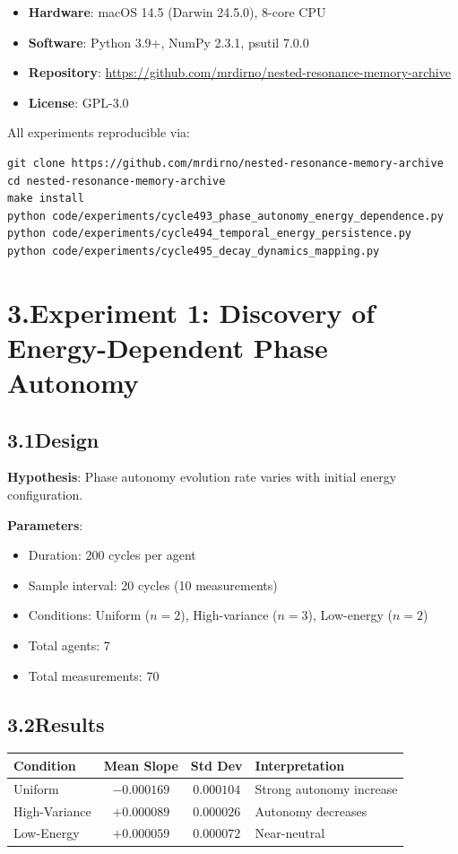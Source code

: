 \documentclass[11pt]{article}
\begin{document}
\begin{itemize}
    \item \textbf{Hardware}: macOS 14.5 (Darwin 24.5.0), 8-core CPU
    \item \textbf{Software}: Python 3.9+, NumPy 2.3.1, psutil 7.0.0
    \item \textbf{Repository}: \url{https://github.com/mrdirno/nested-resonance-memory-archive}
    \item \textbf{License}: GPL-3.0
\end{itemize}

All experiments reproducible via:
\begin{verbatim}
git clone https://github.com/mrdirno/nested-resonance-memory-archive
cd nested-resonance-memory-archive
make install
python code/experiments/cycle493_phase_autonomy_energy_dependence.py
python code/experiments/cycle494_temporal_energy_persistence.py
python code/experiments/cycle495_decay_dynamics_mapping.py
\end{verbatim}

\section*{3.\quad Experiment 1: Discovery of Energy-Dependent Phase Autonomy}

\subsection*{3.1\quad Design}

\noindent\textbf{Hypothesis}: Phase autonomy evolution rate varies with initial energy configuration.

\noindent\textbf{Parameters}:
\begin{itemize}
    \item Duration: 200 cycles per agent
    \item Sample interval: 20 cycles (10 measurements)
    \item Conditions: Uniform ($n=2$), High-variance ($n=3$), Low-energy ($n=2$)
    \item Total agents: 7
    \item Total measurements: 70
\end{itemize}

\subsection*{3.2\quad Results}

\begin{tabular}{l c c l}
\hline
Condition & Mean Slope & Std Dev & Interpretation \\
\hline
Uniform & $-0.000169$ & $0.000104$ & Strong autonomy increase \\
High-Variance & $+0.000089$ & $0.000026$ & Autonomy decreases \\
Low-Energy & $+0.000059$ & $0.000072$ & Near-neutral \\
\hline
\end{tabular}
\end{document}
